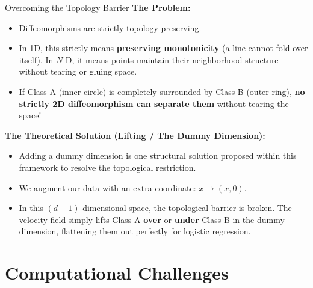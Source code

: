 \documentclass[aspectratio=169]{beamer}
\begin{document}
\begin{frame}{Overcoming the Topology Barrier }
\textbf{The Problem:}
\begin{itemize}
  \item Diffeomorphisms are strictly topology-preserving.
  \item In 1D, this strictly means \textbf{preserving monotonicity} (a line cannot fold over itself). In $N$-D, it means points maintain their neighborhood structure without tearing or gluing space.
  \item If Class A (inner circle) is completely surrounded by Class B (outer ring), \textbf{no strictly 2D diffeomorphism can separate them} without tearing the space!
\end{itemize}

\textbf{The Theoretical Solution (Lifting / The Dummy Dimension):}
\begin{itemize}
  \item Adding a dummy dimension is one structural solution proposed within this framework to resolve the topological restriction.
  \item We augment our data with an extra coordinate: $x \to (x, 0)$.
  \item In this $(d+1)$-dimensional space, the topological barrier is broken. The velocity field simply lifts Class A \textbf{over} or \textbf{under} Class B in the dummy dimension, flattening them out perfectly for logistic regression.
\end{itemize}
\end{frame}

\section{Computational Challenges}
\end{document}
